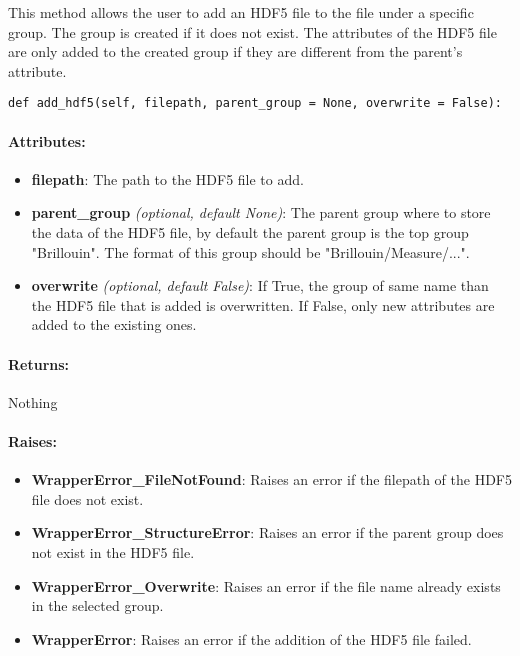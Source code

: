 This method allows the user to add an HDF5 file to the file under a specific group. The group is created if it does not exist. The attributes of the HDF5 file are only added to the created group if they are different from the parent's attribute.

\begin{lstlisting}
def add_hdf5(self, filepath, parent_group = None, overwrite = False):
\end{lstlisting}

\paragraph{Attributes:}

\begin{itemize}
    \item \textbf{filepath}: The path to the HDF5 file to add.
    \item \textbf{parent\_group} \textit{(optional, default None)}: The parent group where to store the data of the HDF5 file, by default the parent group is the top group "Brillouin". The format of this group should be "Brillouin/Measure/...". 
    \item \textbf{overwrite} \textit{(optional, default False)}: If True, the group of same name than the HDF5 file that is added is overwritten. If False, only new attributes are added to the existing ones.
\end{itemize}

\paragraph{Returns:} Nothing

\paragraph{Raises:}

\begin{itemize}
    \item \textbf{WrapperError\_FileNotFound}: Raises an error if the filepath of the HDF5 file does not exist.
    \item \textbf{WrapperError\_StructureError}: Raises an error if the parent group does not exist in the HDF5 file.
    \item \textbf{WrapperError\_Overwrite}: Raises an error if the file name already exists in the selected group.
    \item \textbf{WrapperError}: Raises an error if the addition of the HDF5 file failed.
\end{itemize}


